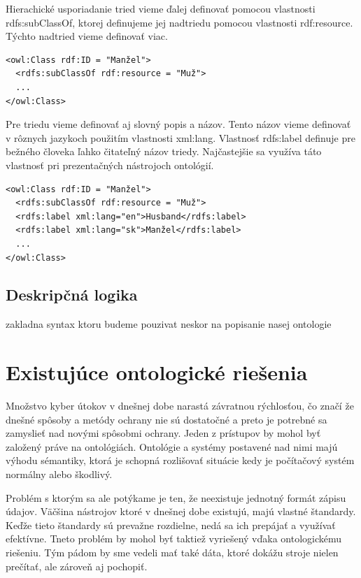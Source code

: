 \documentclass[12pt, a4paper, oneside]{book}
\begin{document}
Hierachické usporiadanie tried vieme ďalej definovať pomocou vlastnosti rdfs:subClassOf, ktorej definujeme jej nadtriedu pomocou vlastnosti rdf:resource. Týchto nadtried vieme definovať viac.
\begin{verbatim}
<owl:Class rdf:ID = "Manžel">
  <rdfs:subClassOf rdf:resource = "Muž">
  ...
</owl:Class>
\end{verbatim}


Pre triedu vieme definovať aj slovný popis a názov. Tento názov vieme definovať v rôznych jazykoch použitím vlastnosti xml:lang. Vlastnosť rdfs:label definuje pre bežného človeka ľahko čitateľný názov triedy. Najčastejšie sa využíva táto vlastnosť pri prezentačných nástrojoch ontológií.


\begin{verbatim}
<owl:Class rdf:ID = "Manžel">
  <rdfs:subClassOf rdf:resource = "Muž">
  <rdfs:label xml:lang="en">Husband</rdfs:label>
  <rdfs:label xml:lang="sk">Manžel</rdfs:label>
  ...
</owl:Class>
\end{verbatim}




\section{Deskripčná logika}
zakladna syntax ktoru budeme pouzivat neskor na popisanie nasej ontologie

\chapter{Existujúce ontologické riešenia}
Množstvo kyber útokov v dnešnej dobe narastá závratnou rýchlosťou, čo značí že dnešné spôsoby a metódy ochrany nie sú dostatočné a preto je potrebné sa zamyslieť nad novými spôsobmi ochrany. Jeden z prístupov by mohol byť založený práve na ontológiách. Ontológie a systémy postavené nad nimi majú výhodu sémantiky, ktorá je schopná rozlišovať situácie kedy je počítačový systém normálny alebo škodlivý.


Problém s ktorým sa ale potýkame je ten, že neexistuje jednotný formát zápisu údajov. Väčšina nástrojov ktoré v dnešnej dobe existujú, majú vlastné štandardy. Keďže tieto štandardy sú prevažne rozdielne, nedá sa ich prepájať a využívať efektívne. Tneto problém by mohol byť taktiež vyriešený vďaka ontologickému riešeniu. Tým pádom by sme vedeli mať také dáta, ktoré dokážu stroje nielen prečítať, ale zároveň aj pochopiť. 
 
\end{document}
